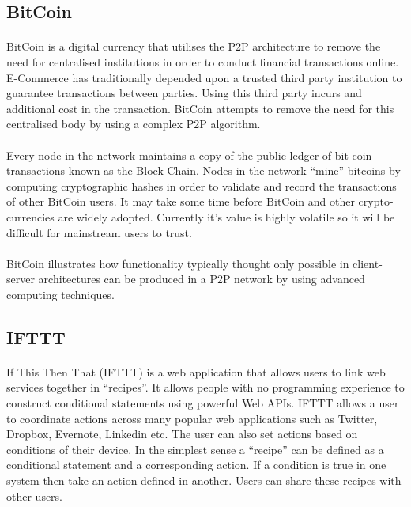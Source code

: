\documentclass[11pt]{amsart}
\begin{document}
\paragraph{}
\subsection{BitCoin}\cite{bitcoin}
\paragraph{}
BitCoin is a digital currency that utilises the P2P architecture to remove the need for centralised institutions in order to conduct financial transactions online. E-Commerce has traditionally depended upon a trusted third party institution to guarantee transactions between parties. Using this third party incurs and additional cost in the transaction. BitCoin attempts to remove the need for this centralised body by using a complex P2P algorithm.
\paragraph{}
Every node in the network maintains a copy of the public ledger of bit coin transactions known as the Block Chain. Nodes in the network ``mine'' bitcoins by computing cryptographic hashes in order to validate and record the transactions of other BitCoin users. It may take some time before BitCoin and other crypto-currencies are widely adopted. Currently it's value is highly volatile so it will be difficult for mainstream users to trust.
\paragraph{}
BitCoin illustrates how functionality typically thought only possible in client-server architectures can be produced in a P2P network by using advanced computing techniques.
\paragraph{}

\subsection{IFTTT}\cite{IFTTT}
\paragraph{}
If This Then That (IFTTT) is a web application that allows users to link web services together in ``recipes''. It allows people with no programming experience to construct conditional statements using powerful Web APIs. 
IFTTT allows a user to coordinate actions across many popular web applications such as Twitter, Dropbox, Evernote, Linkedin etc. The user can also set actions based on conditions of their device. In the simplest sense a ``recipe'' can be defined as a conditional statement and a corresponding action. If a condition is true in one system then take an action defined in another. Users can share these recipes with other users.
\end{document}
